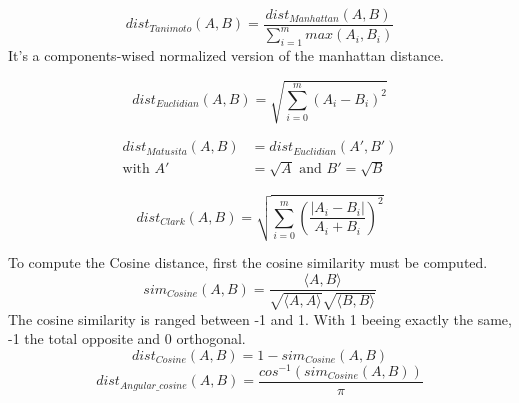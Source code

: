 \begin{definition}
  \begin{equation}
    dist_{Tanimoto}(A, B) = \frac{dist_{Manhattan}(A, B)}{\sum_{i=1}^{m} max(A_i, B_i)}
  \end{equation}
  It's a components-wised normalized version of the manhattan distance.
\end{definition}

\begin{definition}
  \begin{equation}
    dist_{Euclidian}(A, B) = \sqrt{\sum_{i=0}^{m}(A_i - B_i)^2}
  \end{equation}
\end{definition}

\begin{definition}
  \begin{equation}
    \begin{split}
      dist_{Matusita}(A, B) &= dist_{Euclidian}(A', B') \\
      \text{with }A' &= \sqrt{A}\text{ and }B' = \sqrt{B}
    \end{split}
  \end{equation}
\end{definition}

\begin{definition}
  \begin{equation}
    dist_{Clark}(A, B) = \sqrt{\sum_{i=0}^{m}\left(\frac{|A_i - B_i|}{A_i + B_i}\right)^2}
  \end{equation}
\end{definition}

\begin{definition}
  \label{def:cosine_dist}
  To compute the Cosine distance, first the cosine similarity must be computed.
  \begin{equation}
    sim_{Cosine}(A, B) = \frac{\langle A, B \rangle}{\sqrt{\langle A , A \rangle}\sqrt{\langle B, B \rangle}}
  \end{equation}
  The cosine similarity is ranged between -1 and 1.
  With 1 beeing exactly the same, -1 the total opposite and 0 orthogonal.
  \begin{equation}
    dist_{Cosine}(A, B) = 1 - sim_{Cosine}(A, B)
  \end{equation}
  \begin{equation}
    dist_{Angular\_cosine}(A, B) = \frac{cos^{-1}\left( sim_{Cosine}(A, B) \right)}{\pi}
  \end{equation}
\end{definition}


